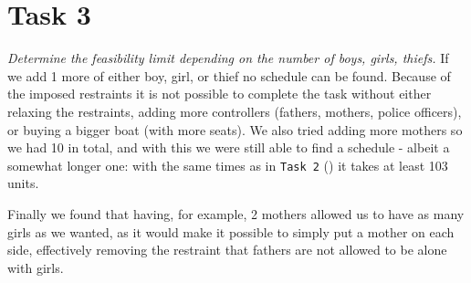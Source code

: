 \section{Task 3}
\label{sec:task3}
\textit{Determine the feasibility limit depending on the number of boys, girls, thiefs.}
If we add 1 more of either boy, girl, or thief no schedule can be found. Because of the imposed restraints it is not possible to complete the task without either relaxing the restraints, adding more controllers (fathers, mothers, police officers), or buying a bigger boat (with more seats). We also tried adding more mothers so we had 10 in total, and with this we were still able to find a schedule - albeit a somewhat longer one: with the same times as in \texttt{Task 2} () it takes at least 103 units.

Finally we found that having, for example, 2 mothers allowed us to have as many girls as we wanted, as it would make it possible to simply put a mother on each side, effectively removing the restraint that fathers are not allowed to be alone with girls.